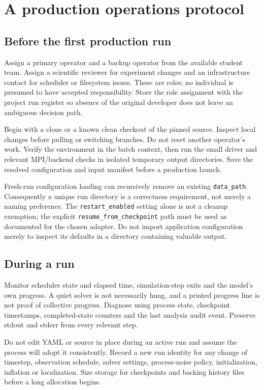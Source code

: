 \documentclass[11pt,a4paper]{article}
\newcommand{\code}[1]{\nolinkurl{#1}}
\begin{document}
\section{A production operations protocol}
\subsection{Before the first production run}
Assign a primary operator and a backup operator from the available student team. Assign a scientific reviewer for experiment changes and an infrastructure contact for scheduler or filesystem issues. These are roles; no individual is presumed to have accepted responsibility. Store the role assignment with the project run register so absence of the original developer does not leave an ambiguous decision path.

Begin with a clone or a known clean checkout of the pinned source. Inspect local changes before pulling or switching branches. Do not reset another operator's work. Verify the environment in the batch context, then run the small driver and relevant MPI/backend checks in isolated temporary output directories. Save the resolved configuration and input manifest before a production launch.

Fresh-run configuration loading can recursively remove an existing \code{data_path}. Consequently a unique run directory is a correctness requirement, not merely a naming preference. The \code{restart_enabled} setting alone is not a cleanup exemption; the explicit \code{resume_from_checkpoint} path must be used as documented for the chosen adapter. Do not import application configuration merely to inspect its defaults in a directory containing valuable output.

\subsection{During a run}
Monitor scheduler state and elapsed time, simulation-step exits and the model's own progress. A quiet solver is not necessarily hung, and a printed progress line is not proof of collective progress. Diagnose using process state, checkpoint timestamps, completed-state counters and the last analysis audit event. Preserve stdout and stderr from every relevant step.

Do not edit YAML or source in place during an active run and assume the process will adopt it consistently. Record a new run identity for any change of timestep, observation schedule, solver settings, process-noise policy, initialization, inflation or localization. Size storage for checkpoints and backing history files before a long allocation begins.
\end{document}
